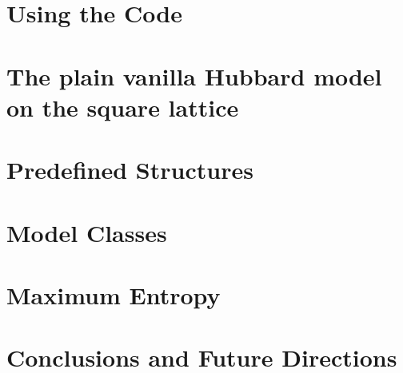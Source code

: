 \documentclass[submission, Phys]{SciPost}
\begin{document}
\section{Using the Code}\label{sec:running}

\section{The plain vanilla Hubbard model on the square lattice} \label{sec:vanilla}

\section{Predefined Structures}\label{sec:predefined}

\section{Model Classes}\label{sec:model_classes}

\section{Maximum Entropy}\label{sec:maxent}

\section{Conclusions and Future Directions}\label{sec:con}


\begin{appendix}



\end{appendix}

\printindex

\nolinenumbers
\end{document}
